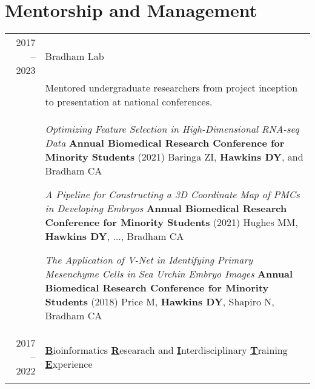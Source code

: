 \documentclass[a4paper,10pt]{report}
\begin{document}
\section{\color{linkcolour} Mentorship and Management}
\begin{longtable}{rp{11.5cm}}
	2017 -- 2023
	 & Bradham Lab                                                                                                                                                                 \\[0.225em]
	 & \small Mentored undergraduate researchers from  project inception to presentation at national conferences.                                                                  \\

	 & \begin{itemize}
		   \vspace{-3.5mm}
		   \footnotesize{\item \emph{Optimizing Feature Selection in High-Dimensional RNA-seq Data}\newline
		         \textbf{Annual Biomedical Research Conference for Minority Students} (2021)\newline
		         Baringa ZI, \textbf{Hawkins DY}, and Bradham CA}
		   \item \emph{A Pipeline for Constructing a 3D Coordinate Map of PMCs in Developing Embryos} \newline
		         \textbf{Annual Biomedical Research Conference for Minority Students} (2021)\newline
		         \footnotesize Hughes MM, \textbf{Hawkins DY}, ..., Bradham CA
		   \item \emph{The Application of V-Net in Identifying Primary Mesenchyme Cells in Sea Urchin Embryo Images} \newline
		         \textbf{Annual Biomedical Research Conference for Minority Students} (2018)\newline
		         Price M, \textbf{Hawkins DY}, Shapiro N, Bradham CA
		         \vspace{-3.5mm}
	   \end{itemize}                                                           \\
	2017 -- 2022
	 & \textbf{\underline{B}}ioinformatics \textbf{\underline{R}}esearach and \textbf{\underline{I}}nterdisciplinary \textbf{\underline{T}}raining \textbf{\underline{E}}xperience \\[0.225em]
	 & \begin{itemize}

\end{itemize}
\end{longtable}
\end{document}

